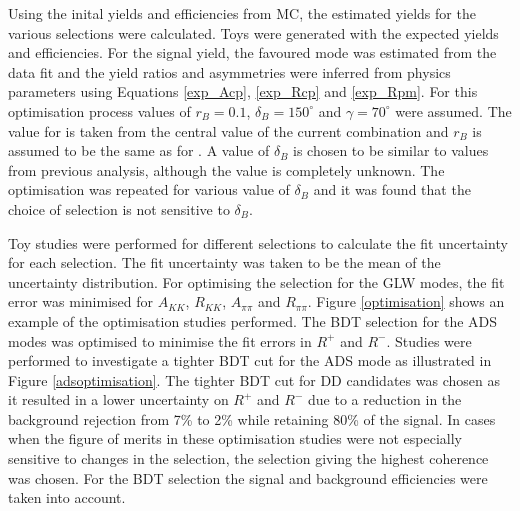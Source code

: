 Using the inital yields and efficiencies from MC, the estimated yields for the various selections were calculated. Toys were generated with the expected yields and efficiencies. For the signal yield, the favoured mode was estimated from the data fit and the yield ratios and asymmetries were inferred from physics parameters using Equations \ref{exp_Acp}, \ref{exp_Rcp} and \ref{exp_Rpm}. For this optimisation process values of $r_B = 0.1$, $\delta_B = 150^{\circ}$ and $\gamma = 70^{\circ}$ were assumed. The value for \Pgamma is taken from the central value of the current \lhcb combination and $r_B$ is assumed to be the same as for \decay{\B}{\D\kaon}. A value of $\delta_B$ is chosen to be similar to values from previous analysis, although the value is completely unknown. The optimisation was repeated for various value of $\delta_B$ and it was found that the choice of selection is not sensitive to $\delta_B$.

Toy studies were performed for different selections to calculate the fit uncertainty for each selection. The fit uncertainty was taken to be the mean of the uncertainty distribution. For optimising the selection for the GLW modes, the fit error was minimised for $A_{KK}$, $R_{KK}$, $A_{\pi\pi}$ and $R_{\pi\pi}$. Figure \ref{optimisation} shows an example of the optimisation studies performed. The BDT selection for the ADS modes was optimised to minimise the fit errors in $R^+$ and $R^-$. Studies were performed to investigate a tighter BDT cut for the ADS mode as illustrated in Figure \ref{adsoptimisation}. The tighter BDT cut for DD candidates was chosen as it resulted in a lower uncertainty on $R^+$ and $R^-$ due to a reduction in the background rejection from 7\% to 2\% while retaining 80\% of the signal. In cases when the figure of merits in these optimisation studies were not especially sensitive to changes in the selection, the selection giving the highest coherence was chosen. For the BDT selection the signal and background efficiencies were taken into account.

